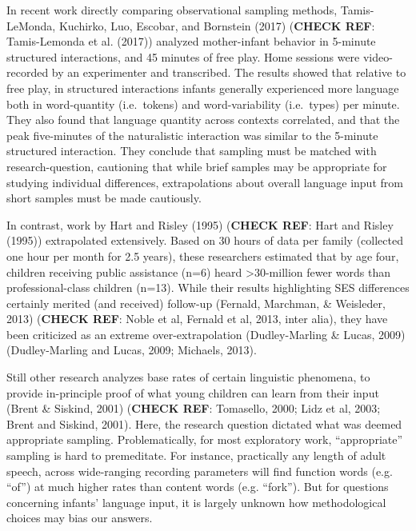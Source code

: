 \documentclass[man]{apa6}
\theoremstyle{definition}
\theoremstyle{definition}
\theoremstyle{definition}
\theoremstyle{remark}
\begin{document}
In recent work directly comparing observational sampling methods,
Tamis-LeMonda, Kuchirko, Luo, Escobar, and Bornstein (2017)
(\textbf{CHECK REF}: Tamis-Lemonda et al. (2017)) analyzed mother-infant
behavior in 5-minute structured interactions, and 45 minutes of free
play. Home sessions were video-recorded by an experimenter and
transcribed. The results showed that relative to free play, in
structured interactions infants generally experienced more language both
in word-quantity (i.e.~tokens) and word-variability (i.e.~types) per
minute. They also found that language quantity across contexts
correlated, and that the peak five-minutes of the naturalistic
interaction was similar to the 5-minute structured interaction. They
conclude that sampling must be matched with research-question,
cautioning that while brief samples may be appropriate for studying
individual differences, extrapolations about overall language input from
short samples must be made cautiously.

In contrast, work by Hart and Risley (1995) (\textbf{CHECK REF}: Hart
and Risley (1995)) extrapolated extensively. Based on 30 hours of data
per family (collected one hour per month for 2.5 years), these
researchers estimated that by age four, children receiving public
assistance (n=6) heard \textgreater{}30-million fewer words than
professional-class children (n=13). While their results highlighting SES
differences certainly merited (and received) follow-up (Fernald,
Marchman, \& Weisleder, 2013) (\textbf{CHECK REF}: Noble et al, Fernald
et al, 2013, inter alia), they have been criticized as an extreme
over-extrapolation (Dudley-Marling \& Lucas, 2009) (Dudley-Marling and
Lucas, 2009; Michaels, 2013).

Still other research analyzes base rates of certain linguistic
phenomena, to provide in-principle proof of what young children can
learn from their input (Brent \& Siskind, 2001) (\textbf{CHECK REF}:
Tomasello, 2000; Lidz et al, 2003; Brent and Siskind, 2001). Here, the
research question dictated what was deemed appropriate sampling.
Problematically, for most exploratory work, \enquote{appropriate}
sampling is hard to premeditate. For instance, practically any length of
adult speech, across wide-ranging recording parameters will find
function words (e.g. \enquote{of}) at much higher rates than content
words (e.g. \enquote{fork}). But for questions concerning infants'
language input, it is largely unknown how methodological choices may
bias our answers.
\end{document}

